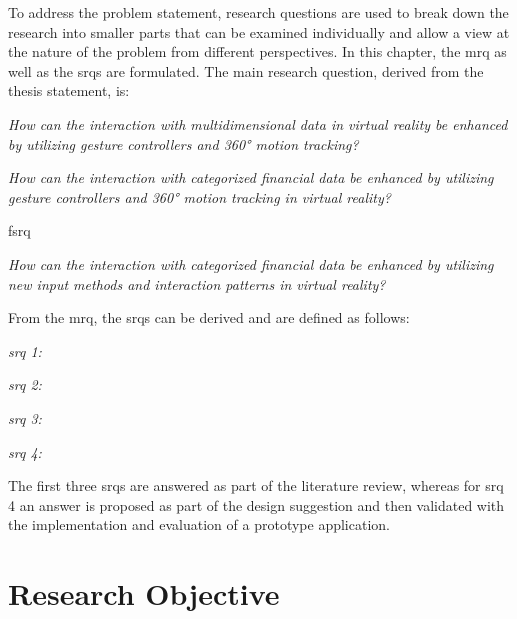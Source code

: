 To address the problem statement, research questions are used to break down the research into smaller parts that can be examined individually and allow a view at the nature of the problem from different perspectives. In this chapter, the \gls{mrq} as well as the \glspl{srq} are formulated. \newline
The main research question, derived from the thesis statement, is:
\begin{framed}
	\textit{How can the interaction with multidimensional data in virtual reality be enhanced by utilizing gesture controllers and 360° motion tracking?}
\end{framed} \label{MRQ}
\begin{framed}
	\textit{How can the interaction with categorized financial data be enhanced by utilizing gesture controllers and 360° motion tracking in virtual reality?}
\end{framed}fsrq
\begin{framed}
	\textit{How can the interaction with categorized financial data be enhanced by utilizing new input methods and interaction patterns in virtual reality?}
\end{framed}
From the \gls{mrq}, the \glspl{srq} can be derived and are defined as follows:
\begin{framed}
	\textit{\gls{srq} 1: \srqonetext}
\end{framed} \label{SRQ1}
\begin{framed}
	\textit{\gls{srq} 2: \srqtwotext}
\end{framed} \label{SRQ2}
\begin{framed}
	\textit{\gls{srq} 3: \srqthreetext}
\end{framed} \label{SRQ3}
 \begin{framed}
 	\textit{\gls{srq} 4: \srqfourtext}
 \end{framed} \label{SRQ4}
The first three \glspl{srq} are answered as part of the literature review, whereas for \gls{srq} 4 an answer is proposed as part of the design suggestion and then validated with the implementation and evaluation of a prototype application.



\section{Research Objective}

